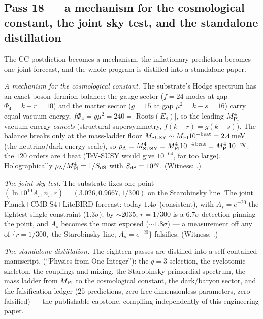 \documentclass[11pt]{article}
\begin{document}
\subsection{Pass 18 --- a mechanism for the cosmological constant, the joint sky test, and the standalone distillation}
\label{sec:capstone-eighteen}

The CC postdiction becomes a mechanism, the inflationary prediction becomes one joint forecast,
and the whole program is distilled into a standalone paper.

\emph{A mechanism for the cosmological constant.} The substrate's Hodge spectrum has an exact
boson--fermion balance: the gauge sector ($f=24$ modes at gap $\Phi_4=k-r=10$) and the matter
sector ($g=15$ at gap $\mu^2=k-s=16$) carry equal vacuum energy, $f\Phi_4=g\mu^2=240=|\mathrm{
Roots}(E_8)|$, so the leading $M_{\rm Pl}^4$ vacuum energy \emph{cancels} (structural supersymmetry,
$f(k-r)=g(k-s)$). The balance breaks only at the mass-ladder floor $M_{\rm SUSY}\sim M_{\rm Pl}
10^{-\mathrm{beat}}=2.4$\,meV (the neutrino/dark-energy scale), so $\rho_\Lambda=M_{\rm SUSY}^4=
M_{\rm Pl}^4 10^{-4\,\mathrm{beat}}=M_{\rm Pl}^4 10^{-vq}$: the $120$ orders are $4\,\mathrm{beat}$
(TeV-SUSY would give $10^{-64}$, far too large). Holographically $\rho_\Lambda/M_{\rm Pl}^4=1/S_{\rm
dS}$ with $S_{\rm dS}=10^{vq}$. (Witness: .)

\emph{The joint sky test.} The substrate fixes one point $(\ln10^{10}A_s,n_s,r)=(3.026,0.9667,
1/300)$ on the Starobinsky line. The joint Planck+CMB-S4+LiteBIRD forecast: today $1.4\sigma$
(consistent), with $A_s=e^{-20}$ the tightest single constraint ($1.3\sigma$); by $\sim$2035,
$r=1/300$ is a $6.7\sigma$ detection pinning the point, and $A_s$ becomes the most exposed
($\sim1.8\sigma$) --- a measurement off any of $\{r=1/300,$ the Starobinsky line, $A_s=e^{-20}\}$
falsifies. (Witness: .)

\emph{The standalone distillation.} The eighteen passes are distilled into a self-contained
manuscript,  (``Physics from One Integer''): the $q=3$ selection, the
cyclotomic skeleton, the couplings and mixing, the Starobinsky primordial spectrum, the mass
ladder from $M_{\rm Pl}$ to the cosmological constant, the dark/baryon sector, and the falsification
ledger ($25$ predictions, zero free dimensionless parameters, zero falsified) --- the
publishable capstone, compiling independently of this engineering paper.
\end{document}
